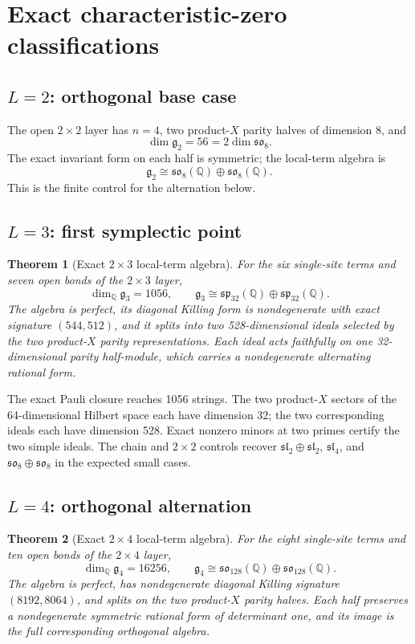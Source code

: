 \documentclass[11pt]{article}
\newtheorem{theorem}{Theorem}[section]
\newcommand{\Q}{\mathbb Q}
\newcommand{\g}{\mathfrak g}
\newcommand{\so}{\mathfrak{so}}
\renewcommand{\sp}{\mathfrak{sp}}
\begin{document}
\section{Exact characteristic-zero classifications}
\subsection{$L=2$: orthogonal base case}
The open $2\times2$ layer has $n=4$, two product-$X$ parity halves of dimension $8$, and
\[
 \dim\g_2=56=2\dim\so_8.
\]
The exact invariant form on each half is symmetric; the local-term algebra is
\[
 \g_2\cong\so_8(\Q)\oplus\so_8(\Q).
\]
This is the finite control for the alternation below.

\subsection{$L=3$: first symplectic point}
\begin{theorem}[Exact $2\times3$ local-term algebra]
For the six single-site terms and seven open bonds of the $2\times3$ layer,
\[
 \dim_{\Q}\g_3=1056,
 \qquad \g_3\cong\sp_{32}(\Q)\oplus\sp_{32}(\Q).
\]
The algebra is perfect, its diagonal Killing form is nondegenerate with exact signature $(544,512)$, and it splits into two 528-dimensional ideals selected by the two product-$X$ parity representations. Each ideal acts faithfully on one 32-dimensional parity half-module, which carries a nondegenerate alternating rational form.
\end{theorem}

The exact Pauli closure reaches 1056 strings. The two product-$X$ sectors of the 64-dimensional Hilbert space each have dimension 32; the two corresponding ideals each have dimension 528. Exact nonzero minors at two primes certify the two simple ideals. The chain and $2\times2$ controls recover $\mathfrak{sl}_2\oplus\mathfrak{sl}_2$, $\mathfrak{sl}_4$, and $\so_8\oplus\so_8$ in the expected small cases.

\subsection{$L=4$: orthogonal alternation}
\begin{theorem}[Exact $2\times4$ local-term algebra]
For the eight single-site terms and ten open bonds of the $2\times4$ layer,
\[
 \dim_{\Q}\g_4=16256,
 \qquad \g_4\cong\so_{128}(\Q)\oplus\so_{128}(\Q).
\]
The algebra is perfect, has nondegenerate diagonal Killing signature $(8192,8064)$, and splits on the two product-$X$ parity halves.  Each half preserves a nondegenerate symmetric rational form of determinant one, and its image is the full corresponding orthogonal algebra.
\end{theorem}
\end{document}
